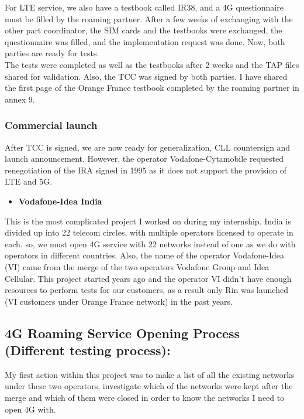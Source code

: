 For \acs{LTE} service, we also have a testbook called IR38, and a \acs{4G} questionnaire must be filled by the roaming partner. After a few weeks of exchanging with the other part coordinator, the \acs{SIM} cards and the testbooks were exchanged, the questionnaire was filled, and the implementation request was done. Now, both parties are ready for tests.\\

The tests were completed as well as the testbooks after 2 weeks and the \acs{TAP} files shared for validation. Also, the \acs{TCC} was signed by both parties.
I have shared the first page of the Orange France testbook completed by the roaming partner in annex 9.\\

\subsubsection{Commercial launch}
\-\hspace{0.5cm} After \acs{TCC} is signed, we are now ready for generalization, \acs{CLL} countersign and launch announcement. However, the operator Vodafone-Cytamobile requested renegotiation of the IRA signed in 1995 as it does not support the provision of \acs{LTE} and \acs{5G}.\\

\begin{itemize}
    \item {\large \textbf{Vodafone-Idea India}}\\
\end{itemize}

This is the most complicated project I worked on during my internship. India is divided up into 22 telecom circles, with multiple operators licensed to operate in each. so, we must open \acs{4G} service with 22 networks instead of one as we do with operators in different countries. Also, the name of the operator Vodafone-Idea (VI) came from the merge of the two operators Vodafone Group and Idea Cellular. This project started years ago and the operator VI didn’t have enough resources to perform tests for our customers, as a result only Rin was launched (VI customers under Orange France network) in the past years.\\

\subsection{\acs{4G} Roaming Service Opening Process (Different testing process):}
\-\hspace{0.5cm} My first action within this project was to make a list of all the existing networks under these two operators, investigate which of the networks were kept after the merge and which of them were closed in order to know the networks I need to open \acs{4G} with.\\

